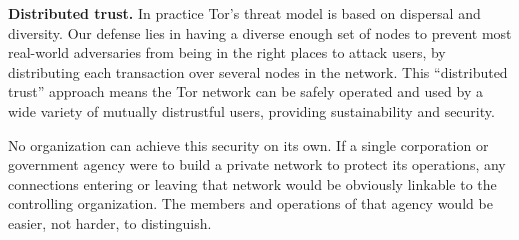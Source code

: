 \documentclass{llncs}
\begin{document}

\medskip
\noindent
{\bf Distributed trust.}
In practice Tor's threat model is based on
dispersal and diversity.
Our defense lies in having a diverse enough set of nodes
to prevent most real-world
adversaries from being in the right places to attack users,
by distributing each transaction
over several nodes in the network.  This ``distributed trust'' approach
means the Tor network can be safely operated and used by a wide variety
of mutually distrustful users, providing sustainability and security.

No organization can achieve this security on its own.  If a single
corporation or government agency were to build a private network to
protect its operations, any connections entering or leaving that network
would be obviously linkable to the controlling organization.  The members
and operations of that agency would be easier, not harder, to distinguish.
\end{document}
